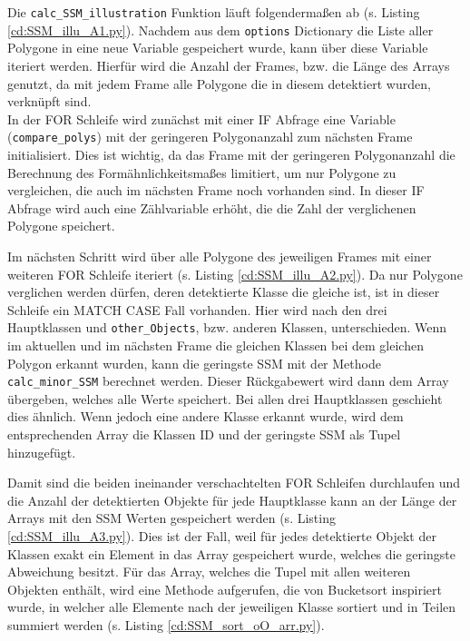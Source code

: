 {	Die \lstinline|calc_SSM_illustration| Funktion läuft folgendermaßen ab \ifimportant(s. Listing \ref{cd:SSM_illu_A1.py})\fi. Nachdem aus dem \lstinline|options| Dictionary die Liste aller Polygone in eine neue Variable gespeichert wurde, kann über diese Variable iteriert werden. Hierfür wird die Anzahl der Frames, bzw. die Länge des Arrays genutzt, da mit jedem Frame alle Polygone die in diesem detektiert wurden, verknüpft sind. \\
	In der FOR Schleife wird zunächst mit einer IF Abfrage eine Variable (\lstinline|compare_polys|) mit der geringeren Polygonanzahl zum nächsten Frame initialisiert. Dies ist wichtig, da das Frame mit der geringeren Polygonanzahl die Berechnung des Formähnlichkeitsmaßes limitiert, um nur Polygone zu vergleichen, die auch im nächsten Frame noch vorhanden sind. In dieser IF Abfrage wird auch eine Zählvariable erhöht, die die Zahl der verglichenen Polygone speichert. \\
	\ifimportant
	
	\fi Im nächsten Schritt wird über alle Polygone des jeweiligen Frames mit einer weiteren FOR Schleife iteriert \ifimportant (s. Listing \ref{cd:SSM_illu_A2.py})\fi. Da nur Polygone verglichen werden dürfen, deren detektierte Klasse die gleiche ist, ist in dieser Schleife ein MATCH CASE Fall vorhanden. Hier wird nach den drei Hauptklassen und \lstinline|other_Objects|, bzw. anderen Klassen, unterschieden. Wenn im aktuellen und im nächsten Frame die gleichen Klassen bei dem gleichen Polygon erkannt wurden, kann die geringste SSM mit der Methode \lstinline|calc_minor_SSM| berechnet werden. Dieser Rückgabewert wird dann dem Array übergeben, welches alle Werte speichert. Bei allen drei Hauptklassen geschieht dies ähnlich. Wenn jedoch eine andere Klasse erkannt wurde, wird dem entsprechenden Array die Klassen ID und der geringste SSM als Tupel hinzugefügt. \\
	\ifimportant
	
	\fi Damit sind die beiden ineinander verschachtelten FOR Schleifen durchlaufen und die Anzahl der detektierten Objekte für jede Hauptklasse kann an der Länge der Arrays mit den SSM Werten gespeichert werden \ifimportant (s. Listing \ref{cd:SSM_illu_A3.py})\fi. Dies ist der Fall, weil für jedes detektierte Objekt der Klassen exakt ein Element in das Array gespeichert wurde, welches die geringste Abweichung besitzt. Für das Array, welches die Tupel mit allen weiteren Objekten enthält, wird eine Methode aufgerufen, die von Bucketsort inspiriert wurde, in welcher alle Elemente nach der jeweiligen Klasse sortiert und in Teilen summiert werden \ifimportant (s. Listing \ref{cd:SSM_sort_oO_arr.py})\fi.  \\
}
